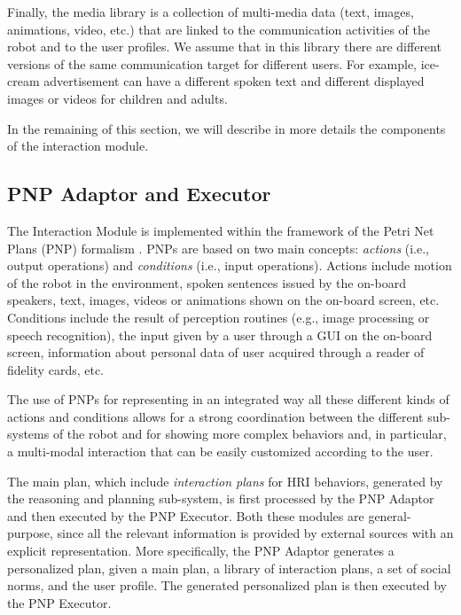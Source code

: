 Finally, the media library is a collection of multi-media data (text, images, animations, video, etc.) that are linked to the communication activities of the robot and to the user profiles. We assume that in this library there are different versions of the same communication target for different users. For example, ice-cream advertisement can have a different spoken text and different displayed images or videos for children and adults.

In the remaining of this section, we will describe in more details the components of the interaction module.

\subsection{PNP Adaptor and Executor}

The Interaction Module is implemented within the framework of the Petri Net Plans (PNP) formalism \cite{ZiIo11PNP}. PNPs are based on two main concepts: \emph{actions} (i.e., output operations) and \emph{conditions} (i.e., input operations). Actions include motion of the robot in the environment, spoken sentences issued by the on-board speakers, text, images, videos or animations shown on the on-board screen, etc.
Conditions include the result of perception routines (e.g., image processing or speech recognition), the input given by a user through a GUI on the on-board screen, information about personal data of user acquired through a reader of fidelity cards, etc.

The use of PNPs for representing in an integrated way all these different kinds of actions and conditions allows for a strong coordination between the different sub-systems of the robot and for showing more complex behaviors and, in particular, a multi-modal interaction that can be easily customized according to the user.


The main plan, which include \emph{interaction plans} for HRI behaviors, generated by the reasoning and planning sub-system, is first processed by the PNP Adaptor and then executed by the PNP Executor. Both these modules are general-purpose, since all the relevant information is provided by external sources with an explicit representation. More specifically, the PNP Adaptor generates a personalized plan, given a main plan, a library of interaction plans, a set of social norms, and the user profile. The generated personalized plan is then executed by the PNP Executor. 

